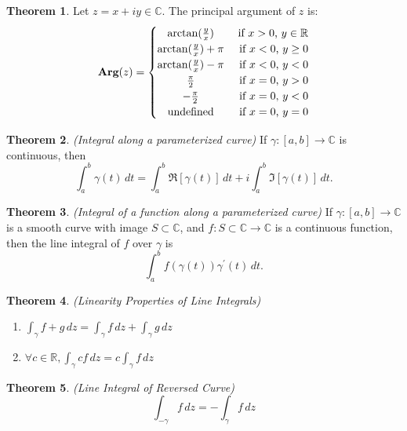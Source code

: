 \documentclass[a4paper]{article}
\theoremstyle{definition}
\newtheorem{theorem}{Theorem}
\begin{document}
	\begin{theorem}
		Let $z = x + iy \in \mathbb{C}$. The principal argument of $z$ is:
		\begin{eqnarray*}
			\textbf{Arg}(z)= \left\{\def\arraystretch{1.2}%
			\begin{array}{@{}c@{\quad}r@{}}
				\arctan (\frac{y}{x}) & \;\text{if $x>0$, $y\in \mathbb R$}\\
				\arctan (\frac{y}{x})+\pi  & \;\text{if $x <0$, $y\geq 0$}\\
				\arctan (\frac{y}{x})-\pi  & \;\text{if $x < 0$, $y < 0$}\\
				\frac{\pi}{2} & \;\text{if $x=0$, $y> 0$}\\
				-\frac{\pi}{2} & \;\text{if $x=0$, $y < 0$}\\
				\text{undefined}& \;\text{if $x=0$, $y=0$}\\
			\end{array}\right.
		\end{eqnarray*}
	\end{theorem}
	
	\begin{theorem}
		\emph{(Integral along a parameterized curve)}
		If $\gamma : [a,b] \rightarrow \mathbb{C}$ is continuous, then 
		$$\int_{a}^{b} \gamma (t) \, dt = \int_{a}^{b} \Re{[\gamma(t)] \, dt} + i \int_{a}^{b} \Im{[\gamma(t)] \, dt}.$$
	\end{theorem}
	
	\begin{theorem}
		\emph{(Integral of a function along a parameterized curve)}
		If $\gamma : [a,b] \rightarrow \mathbb{C}$ is a smooth curve with image $S \subset \mathbb{C}$, and $f : S \subset \mathbb{C} \rightarrow \mathbb{C}$ is a continuous function, then the line integral of $f$ over $\gamma$ is 
		$$\int_{a}^{b} f(\gamma (t)) \gamma^{\prime}(t) \, dt.$$
	\end{theorem}
	
	\begin{theorem}
		\emph{(Linearity Properties of Line Integrals)}
		\begin{enumerate}[label=\alph*.]
			\item $\int_{\gamma} f + g \, dz = \int_{\gamma} f \, dz + \int_{\gamma} g \, dz$
			\item $\forall c \in \mathbb{R}, \int_{\gamma} c f \, dz = c \int_{\gamma} f \, dz$
		\end{enumerate}
	\end{theorem}
	
	\begin{theorem}
		\emph{(Line Integral of Reversed Curve)}
		$$\int_{-\gamma} f \, dz = - \int_{\gamma} f \, dz$$
	\end{theorem}
	
\end{document}
